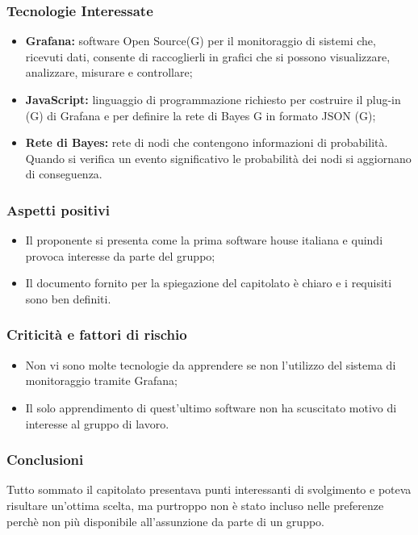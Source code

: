 \subsubsection{Tecnologie Interessate}
\begin{itemize}
	\item \textbf{Grafana: }software Open Source(G) per il monitoraggio di sistemi che, ricevuti dati, consente di raccoglierli            					      in grafici che si possono visualizzare, analizzare, misurare e controllare; 
	\item \textbf{JavaScript: }linguaggio di programmazione richiesto per costruire il plug-in (G) di Grafana e
	per definire la rete di Bayes G in formato JSON (G);
	\item \textbf{Rete di Bayes: }rete di nodi che contengono informazioni di probabilità. Quando si verifica un evento 								     significativo le probabilità dei nodi si aggiornano di conseguenza.
\end{itemize}
\subsubsection{Aspetti positivi}
\begin{itemize}
	\item Il proponente si presenta come la prima software house italiana e quindi provoca interesse da parte del gruppo;
	\item Il documento fornito per la spiegazione del capitolato è chiaro e i requisiti sono ben definiti.
\end{itemize}
\subsubsection{Criticità e fattori di rischio}
\begin{itemize}
	\item Non vi sono molte tecnologie da apprendere se non l'utilizzo del sistema di monitoraggio tramite Grafana;
	\item Il solo apprendimento di quest'ultimo software non ha scuscitato motivo di interesse al gruppo di lavoro.
\end{itemize}
\subsubsection{Conclusioni}
Tutto sommato il capitolato presentava punti interessanti di svolgimento e poteva risultare un'ottima scelta, ma 					purtroppo non è stato incluso nelle preferenze perchè non più disponibile all'assunzione da parte di un gruppo. 